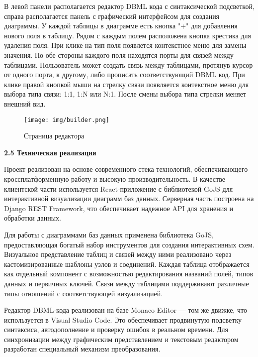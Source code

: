 В левой панели располагается редактор DBML кода с синтаксической подсветкой, справа располагается панель с графический интерфейсом для создания диаграммы. У каждой таблицы в диаграмме есть кнопка "+" для добавления нового поля в таблицу. Рядом с каждым полем расположена кнопка крестика для удаления поля. При клике на тип поля появлется контекстное меню для замены значения. По обе стороны каждого поля находятся порты для связей между таблицами. Пользователь может создать связь между таблицами, протянув курсор от одного порта, к другому, либо прописать соответствующий DBML код. При клике правой кнопкой мыши на стрелку связи появляется контекстное меню для выбора типа связи: 1:1, 1:N или N:1. После смены выбора типа стрелки меняет внешний вид.
    
\renewcommand{\figurename}{Рисунок}
\begin{figure}[htbp]
    \centering %
    \texttt{[image: img/builder.png]}
    \caption{Страница редактора}
    \label{fig:analyze} %
\end{figure}

\textbf{\large 2.5 Техническая реализация}

Проект реализован на основе современного стека технологий, обеспечивающего кроссплатформенную работу и высокую производительность. В качестве клиентской части используется React-приложение с библиотекой GoJS для интерактивной визуализации диаграмм баз данных. Серверная часть построена на Django REST Framework, что обеспечивает надежное API для хранения и обработки данных.

Для работы с диаграммами баз данных применена библиотека GoJS, предоставляющая богатый набор инструментов для создания интерактивных схем. Визуальное представление таблиц и связей между ними реализовано через кастомизированные шаблоны узлов и соединений. Каждая таблица отображается как отдельный компонент с возможностью редактирования названий полей, типов данных и первичных ключей. Связи между таблицами поддерживают различные типы отношений с соответствующей визуализацией.

Редактор DBML-кода реализован на базе Monaco Editor — том же движке, что используется в Visual Studio Code. Это обеспечивает продвинутую подсветку синтаксиса, автодополнение и проверку ошибок в реальном времени. Для синхронизации между графическим представлением и текстовым редактором разработан специальный механизм преобразования.

